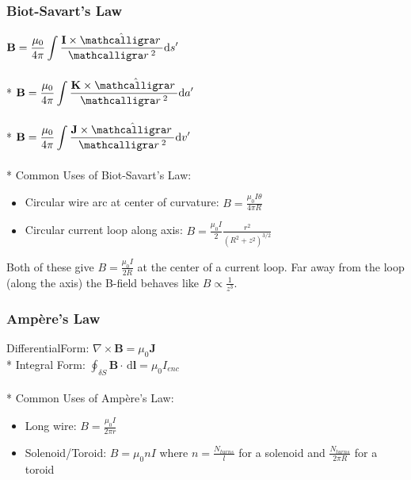 \subsubsection{Biot-Savart's Law}
\(\displaystyle\mathbf{B}=\frac{\mu_0}{4\pi}\int\frac{\mathbf{I}\times\hat{\scriptr}}{\scriptr^2}\mathrm{d}s'\)\\\\*
\(\displaystyle\mathbf{B}=\frac{\mu_0}{4\pi}\int\frac{\mathbf{K}\times\hat{\scriptr}}{\scriptr^2}\mathrm{d}a'\)\\\\*
\(\displaystyle\mathbf{B}=\frac{\mu_0}{4\pi}\int\frac{\mathbf{J}\times\hat{\scriptr}}{\scriptr^2}\mathrm{d}v'\)\\\\*
Common Uses of Biot-Savart's Law:
\begin{itemize}
\item Circular wire arc at center of curvature: \(\displaystyle B=\frac{\mu_0I\theta}{4\pi R}\)
\item Circular current loop along axis: \(\displaystyle B=\frac{\mu_0I}{2}\frac{r^2}{\left(R^2+z^2\right)^{3/2}}\)
\end{itemize}
Both of these give \(\displaystyle B=\frac{\mu_0I}{2R}\) at the center of a current loop.
Far away from the loop (along the axis) the B-field behaves like \(\displaystyle B\propto\frac{1}{z^3}\).

\subsubsection{Amp\`ere's Law}
DifferentialForm: \(\nabla\times\mathbf{B}=\mu_0\mathbf{J}\)\\*
Integral Form: \(\displaystyle\oint_{\delta S}\mathbf{B}\cdot\,\mathrm{d}\mathbf{l}=\mu_0 I_{enc}\)\\\\*
Common Uses of Amp\`ere's Law:
\begin{itemize}
\item Long wire: \(\displaystyle B=\frac{\mu_0I}{2\pi r}\)
\item Solenoid/Toroid: \(\displaystyle B=\mu_0 n I\) where \(\displaystyle n=\frac{N_{turns}}{l}\) for a solenoid and \(\displaystyle\frac{N_{turns}}{2\pi R}\) for a toroid
\end{itemize}

